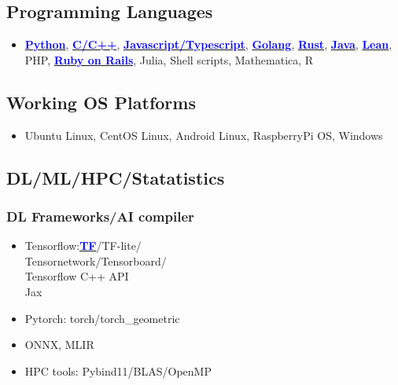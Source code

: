\documentclass[11pt]{article}
\begin{document}
\begin{multicols*}{2}
\begin{skillbox}
\subsection*{Programming Languages}
\begin{itemize}[noitemsep]
    \item \href{https://github.com/Kuo-TingKai/submarine-cable-monitor}{\textbf{\textcolor{blue}{Python}}}, 
    \href{https://github.com/Kuo-TingKai/cpp_linux_chat}{\textbf{\textcolor{blue}{C/C++}}}, 
    \href{https://github.com/Kuo-TingKai/three-3d-game}{\textbf{\textcolor{blue}{Javascript/Typescript}}}, 
    \href{https://github.com/Kuo-TingKai/golang-web3-app}{\textbf{\textcolor{blue}{Golang}}},
    \href{https://github.com/xiph/rav1e/compare/master...Kuo-TingKai:rav1e:master}{\textbf{\textcolor{blue}{Rust}}},
    \href{https://github.com/Kuo-TingKai/java-backend-cloud-maven-app}{\textbf{\textcolor{blue}{Java}}}, 
    \href{https://github.com/Kuo-TingKai/lean4-basic-ag}{\textbf{\textcolor{blue}{Lean}}}, PHP, 
    \href{https://github.com/Kuo-TingKai/RoR-app}{\textbf{\textcolor{blue}{Ruby on Rails}}}, 
    Julia, Shell scripts, Mathematica, R
\end{itemize}

\subsection*{Working OS Platforms}
\begin{itemize}[noitemsep]
    \item Ubuntu Linux, CentOS Linux, Android Linux, RaspberryPi OS, Windows
\end{itemize}

\subsection*{DL/ML/HPC/Statatistics}

\subsubsection*{DL Frameworks/AI compiler}
\begin{itemize}[noitemsep]
    \item Tensorflow:\href{https://github.com/Kuo-TingKai/TNNN}{\textbf{\textcolor{blue}{TF}}}/TF-lite/\\Tensornetwork/Tensorboard/\\Tensorflow C++ API\\
    Jax
    \item Pytorch: torch/torch\_geometric
    \item ONNX, MLIR
    \item HPC tools: Pybind11/BLAS/OpenMP 
\end{itemize}

\end{skillbox}
\end{multicols*}
\end{document}
